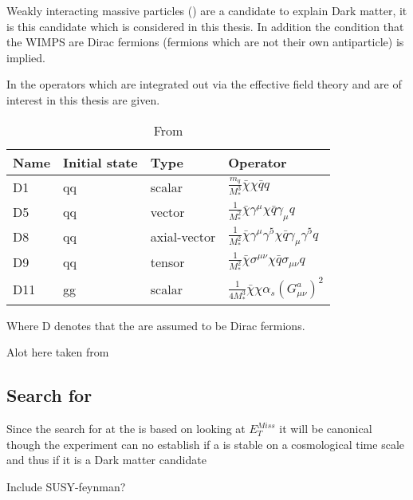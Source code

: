 Weakly interacting massive particles (\abbrWIMPS) are a candidate to explain Dark matter, it is this candidate which is considered in this thesis.
In addition the condition that the WIMPS are Dirac fermions (fermions which are not their own antiparticle) is implied.

In  the operators which are integrated out via the effective field theory and are of interest in this thesis are given.
\renewcommand{\arraystretch}{1.5} %
\begin{table}[H]
\begin{center}
    \begin{tabular}{ | l | l | l | l |}
    \hline
    Name & Initial state & Type & Operator \\ \hline
  	D1 & qq & scalar & $\frac{m_q}{M^3_*} \bar{\chi} \chi \bar{q} q$ \\ \hline
  	D5 & qq & vector & $\frac{1}{M^2_*} \bar{\chi} \gamma^\mu \chi \bar{q} \gamma_\mu q$ \\ \hline
  	D8 & qq & axial-vector & $\frac{1}{M^2_*}\bar{\chi}\gamma^\mu \gamma^5 \chi \bar{q} \gamma_\mu \gamma^5 q $ \\ \hline
  	D9 & qq & tensor & $\frac{1}{M^2_*} \bar{\chi}\sigma^{\mu \nu} \chi \bar{q} \sigma_{\mu \nu} q  $\\ \hline
  	D11 & gg & scalar & $\frac{1}{4M^3_*}\bar{\chi}\chi \alpha_s (G^a_{\mu \nu})^2 $\\ \hline
  	\end{tabular}

  	\caption{From \citep{CERN-PH-EP-2012-210}}
  	\label{tab:operators}
  	  	\end{center}
    \end{table}
\renewcommand{\arraystretch}{1.0}  %
Where D denotes that the \abbrWIMPS are assumed to be Dirac fermions.

Alot here taken from \citep{82.116010}

\subsection{Search for \abbrWIMPS}
Since the search for \abbrWIMPS at the \abbrLHC is based on looking at $E_T^{Miss}$ it will be canonical though the experiment can no establish if a \abbrWIMP is stable on a cosmological time scale and thus if it is a Dark matter candidate \citep{CERN-PH-EP-2012-210}

Include SUSY-feynman?

